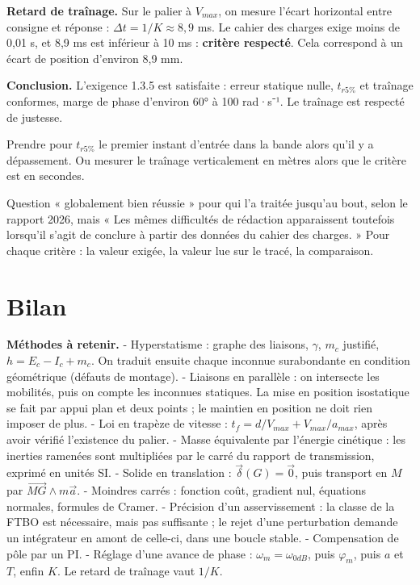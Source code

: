 \documentclass[11pt,a4paper]{article}
\begin{document}
\textbf{Retard de traînage.} Sur le palier à \(V_{max}\), on mesure l'écart horizontal entre consigne et réponse : \(\Delta t = 1/K\approx 8{,}9\) ms. Le cahier des charges exige moins de 0,01 s, et 8,9 ms est inférieur à 10 ms : \textbf{critère respecté}. Cela correspond à un écart de position d'environ 8,9 mm.

\textbf{Conclusion.} L'exigence 1.3.5 est satisfaite : erreur statique nulle, \(t_{r5\%}\) et traînage conformes, marge de phase d'environ 60° à 100 rad·s⁻¹. Le traînage est respecté de justesse.

\begin{piege}

Prendre pour \(t_{r5\%}\) le premier instant d'entrée dans la bande alors qu'il y a dépassement. Ou mesurer le traînage verticalement en mètres alors que le critère est en secondes.

\end{piege}

\begin{jury}

Question « globalement bien réussie » pour qui l'a traitée jusqu'au bout, selon le rapport 2026, mais « Les mêmes difficultés de rédaction apparaissent toutefois lorsqu'il s'agit de conclure à partir des données du cahier des charges. » Pour chaque critère : la valeur exigée, la valeur lue sur le tracé, la comparaison.

\end{jury}

\hypertarget{bilan}{%
\section{Bilan}\label{bilan}}

\textbf{Méthodes à retenir.}
- Hyperstatisme : graphe des liaisons, \(\gamma\), \(m_c\) justifié, \(h = E_c - I_c + m_c\). On traduit ensuite chaque inconnue surabondante en condition géométrique (défauts de montage).
- Liaisons en parallèle : on intersecte les mobilités, puis on compte les inconnues statiques. La mise en position isostatique se fait par appui plan et deux points ; le maintien en position ne doit rien imposer de plus.
- Loi en trapèze de vitesse : \(t_f = d/V_{max} + V_{max}/a_{max}\), après avoir vérifié l'existence du palier.
- Masse équivalente par l'énergie cinétique : les inerties ramenées sont multipliées par le carré du rapport de transmission, exprimé en unités SI.
- Solide en translation : \(\vec\delta(G) = \vec 0\), puis transport en \(M\) par \(\overrightarrow{MG}\wedge m\vec a\).
- Moindres carrés : fonction coût, gradient nul, équations normales, formules de Cramer.
- Précision d'un asservissement : la classe de la FTBO est nécessaire, mais pas suffisante ; le rejet d'une perturbation demande un intégrateur en amont de celle-ci, dans une boucle stable.
- Compensation de pôle par un PI.
- Réglage d'une avance de phase : \(\omega_m = \omega_{0dB}\), puis \(\varphi_m\), puis \(a\) et \(T\), enfin \(K\). Le retard de traînage vaut \(1/K\).
\end{document}
